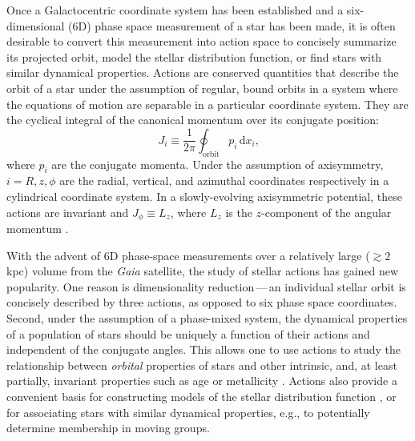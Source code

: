 \documentclass[twocolumn]{aastex62}
\newcommand{\beq}{\begin{equation}}
\newcommand{\eeq}{\end{equation}}
\begin{document}
Once a Galactocentric coordinate system has been established and a
six-dimensional (6D) phase space measurement of a star has been made, it is
often desirable to convert this measurement into action space to concisely
summarize its projected orbit, model the stellar distribution function, or find
stars with similar dynamical properties. Actions are conserved quantities that
describe the orbit of a star under the assumption of regular, bound orbits in a
system where the equations of motion are separable in a particular coordinate
system. They are the cyclical integral of the canonical momentum over its
conjugate position: \beq\label{eq:actions} J_i \equiv \frac{1}{2\pi}
\oint_{\text{orbit}}p_i\,\text{d}x_i\text{,} \eeq where $p_i$ are the conjugate
momenta. Under the assumption of axisymmetry, $i=R,z,\phi$ are the radial,
vertical, and azimuthal coordinates respectively in a cylindrical coordinate
system. In a slowly-evolving axisymmetric potential, these actions are invariant
and $J_{\phi} \equiv L_z$, where $L_z$ is the $z$-component of the angular
momentum \citep{2008gady.book.....B,2014RvMP...86....1S}.

With the advent of 6D phase-space measurements over a relatively large ($\gtrsim
2$ kpc) volume from the \textit{Gaia} satellite, the study of stellar actions
has gained new popularity. One reason is dimensionality reduction\,---\,an
individual stellar orbit is concisely described by three actions, as opposed to
six phase space coordinates. Second, under the assumption of a phase-mixed
system, the dynamical properties of a population of stars should be uniquely a
function of their actions and independent of the conjugate angles. This allows
one to use actions to study the relationship between \emph{orbital} properties
of stars and other intrinsic, and, at least partially, invariant properties such
as age or metallicity \citep{2018ApJ...867...31B, 2018arXiv180803278T,
2018MNRAS.481.4093S, 2019arXiv190304030G, 2019arXiv190309320D,
2019MNRAS.486.1167B}. Actions also provide a convenient basis for constructing
models of the stellar distribution function \citep[e.g.,][]{1915MNRAS..76...70J,
1985ApJ...295..388V, 2017ApJ...839...61T}, or for associating stars with similar
dynamical properties, e.g., to potentially determine membership in moving
groups.
\end{document}

